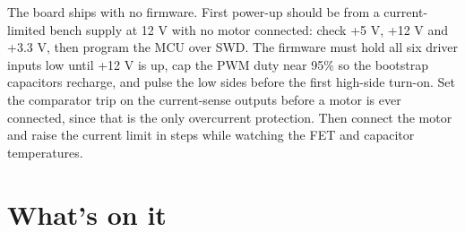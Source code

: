 The board ships with no firmware. First power-up should be from a
current-limited bench supply at 12 V with no motor connected: check +5 V,
+12 V and +3.3 V, then program the MCU over SWD. The firmware must hold all six
driver inputs low until +12 V is up, cap the PWM duty near 95\% so the bootstrap
capacitors recharge, and pulse the low sides before the first high-side turn-on.
Set the comparator trip on the current-sense outputs before a motor is ever
connected, since that is the only overcurrent protection. Then connect the motor
and raise the current limit in steps while watching the FET and capacitor
temperatures.

\section{What's on it}

